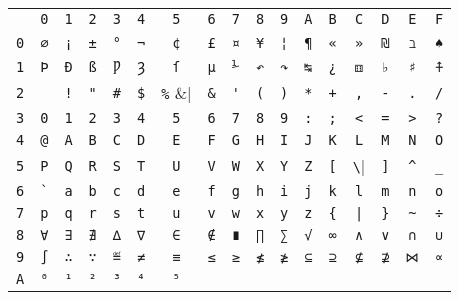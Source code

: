 \documentclass{article}
\begin{document}
\begin{tabular}{c c c c c c c c c c c c c c c c c}
\verb| | & \verb|0| & \verb|1| & \verb|2| & \verb|3| & \verb|4| & \verb|5| &
\verb|6| & \verb|7| & \verb|8| & \verb|9| & \verb|A| & \verb|B| & \verb|C| &
\verb|D| & \verb|E| & \verb|F| \\
\verb|0| & \verb|∅| & \verb|¡| & \verb|±| & \verb|°| & \verb|¬| & \verb|¢| &
\verb|£| & \verb|¤| & \verb|¥| & \verb|¦| & \verb|¶| & \verb|«| & \verb|»| &
\verb|₪| & \verb|ℶ| & \verb|♠| \\
\verb|1| & \verb|Þ| & \verb|Ð| & \verb|ß| & \verb|Ƿ| & \verb|Ȝ| & \verb|ſ| &
\verb|µ| & \verb|⅟| & \verb|↶| & \verb|↷| & \verb|↹| & \verb|¿| & \verb|⚅| &
\verb|♭| & \verb|♯| & \verb|⍏| \\
\verb|2| & \verb| | & \verb|!| & \verb|"| & \verb|#| & \verb|$| & \verb|%| &
\verb|&| & \verb|'| & \verb|(| & \verb|)| & \verb|*| & \verb|+| & \verb|,| &
\verb|-| & \verb|.| & \verb|/| \\
\verb|3| & \verb|0| & \verb|1| & \verb|2| & \verb|3| & \verb|4| & \verb|5| &
\verb|6| & \verb|7| & \verb|8| & \verb|9| & \verb|:| & \verb|;| & \verb|<| &
\verb|=| & \verb|>| & \verb|?| \\
\verb|4| & \verb|@| & \verb|A| & \verb|B| & \verb|C| & \verb|D| & \verb|E| &
\verb|F| & \verb|G| & \verb|H| & \verb|I| & \verb|J| & \verb|K| & \verb|L| &
\verb|M| & \verb|N| & \verb|O| \\
\verb|5| & \verb|P| & \verb|Q| & \verb|R| & \verb|S| & \verb|T| & \verb|U| &
\verb|V| & \verb|W| & \verb|X| & \verb|Y| & \verb|Z| & \verb|[| & \verb|\| &
\verb|]| & \verb|^| & \verb|_| \\
\verb|6| & \verb|`| & \verb|a| & \verb|b| & \verb|c| & \verb|d| & \verb|e| &
\verb|f| & \verb|g| & \verb|h| & \verb|i| & \verb|j| & \verb|k| & \verb|l| &
\verb|m| & \verb|n| & \verb|o| \\
\verb|7| & \verb|p| & \verb|q| & \verb|r| & \verb|s| & \verb|t| & \verb|u| &
\verb|v| & \verb|w| & \verb|x| & \verb|y| & \verb|z| & \verb|{| & \verb/|/ &
\verb|}| & \verb|~| & \verb|÷| \\
\verb|8| & \verb|∀| & \verb|∃| & \verb|∄| & \verb|∆| & \verb|∇| & \verb|∈| &
\verb|∉| & \verb|∎| & \verb|∏| & \verb|∑| & \verb|√| & \verb|∞| & \verb|∧| &
\verb|∨| & \verb|∩| & \verb|∪| \\
\verb|9| & \verb|∫| & \verb|∴| & \verb|∵| & \verb|≝| & \verb|≠| & \verb|≡| &
\verb|≤| & \verb|≥| & \verb|≰| & \verb|≱| & \verb|⊆| & \verb|⊇| & \verb|⊈| &
\verb|⊉| & \verb|⋈| & \verb|∝| \\
\verb|A| & \verb|⁰| & \verb|¹| & \verb|²| & \verb|³| & \verb|⁴| & \verb|⁵| &

\end{tabular}
\end{document}
